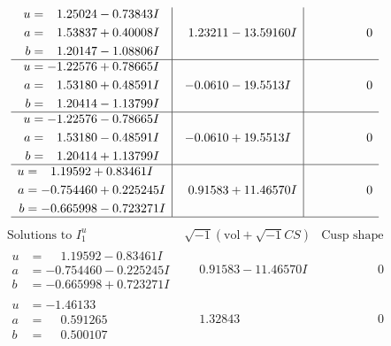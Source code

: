 \documentclass[1p]{elsarticle_modified}
\theoremstyle{definition}
\newcommand{\I}{\sqrt{-1}}
\begin{document}
$$\begin{array}{c|c|c}
\begin{aligned}
u &= \phantom{-}1.25024 - 0.73843 I \\
a &= \phantom{-}1.53837 + 0.40008 I \\
b &= \phantom{-}1.20147 - 1.08806 I\end{aligned}
 & \phantom{-}1.23211 - 13.59160 I & \phantom{-0.000000 } 0 \\ \hline\begin{aligned}
u &= -1.22576 + 0.78665 I \\
a &= \phantom{-}1.53180 + 0.48591 I \\
b &= \phantom{-}1.20414 - 1.13799 I\end{aligned}
 & -0.0610 - 19.5513 I & \phantom{-0.000000 } 0 \\ \hline\begin{aligned}
u &= -1.22576 - 0.78665 I \\
a &= \phantom{-}1.53180 - 0.48591 I \\
b &= \phantom{-}1.20414 + 1.13799 I\end{aligned}
 & -0.0610 + 19.5513 I & \phantom{-0.000000 } 0 \\ \hline\begin{aligned}
u &= \phantom{-}1.19592 + 0.83461 I \\
a &= -0.754460 + 0.225245 I \\
b &= -0.665998 - 0.723271 I\end{aligned}
 & \phantom{-}0.91583 + 11.46570 I & \phantom{-0.000000 } 0\\
 \hline 
 \end{array}$$\newpage$$\begin{array}{c|c|c}  
\text{Solutions to }I^u_{1}& \I (\text{vol} + \sqrt{-1}CS) & \text{Cusp shape}\\
 \hline 
\begin{aligned}
u &= \phantom{-}1.19592 - 0.83461 I \\
a &= -0.754460 - 0.225245 I \\
b &= -0.665998 + 0.723271 I\end{aligned}
 & \phantom{-}0.91583 - 11.46570 I & \phantom{-0.000000 } 0 \\ \hline\begin{aligned}
u &= -1.46133\phantom{ +0.000000I} \\
a &= \phantom{-}0.591265\phantom{ +0.000000I} \\
b &= \phantom{-}0.500107\phantom{ +0.000000I}\end{aligned}
 & \phantom{-}1.32843\phantom{ +0.000000I} & \phantom{-0.000000 } 0 \\ \hline\begin{aligned}

\end{aligned}
\end{array}$$
\end{document}
